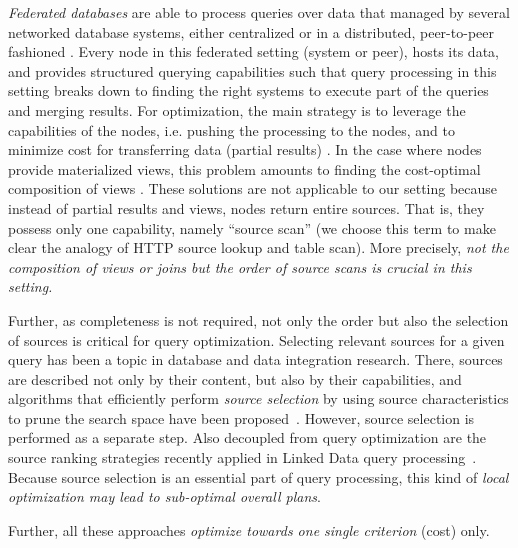 \emph{Federated databases} are able to process queries over data that
managed by several networked database systems, either centralized
\cite{} or in a distributed, peer-to-peer fashioned \cite{}. Every
node in this federated setting (system or peer), hosts its data, and
provides structured querying capabilities such that query processing
in this setting breaks down to finding the right systems to execute
part of the queries and merging results. For optimization, the main
strategy is to leverage the capabilities of the nodes, i.e. pushing
the processing to the nodes, and to minimize cost for transferring
data (partial results) \cite{}. In the case where nodes provide
materialized views, this problem amounts to finding the cost-optimal
composition of views \cite{pottinger_minicon:_2001}. These solutions
are not applicable to our setting because instead of partial results
and views, nodes return entire sources. That is, they possess only one
capability, namely ``source scan'' (we choose this term to make clear
the analogy of HTTP source lookup and table scan). More precisely,
\emph{not the composition of views or joins but the order of source
  scans is crucial in this setting.} 

Further, as completeness is not required, not only the order but also
the selection of sources is critical for query optimization. Selecting
relevant sources for a given query has been a topic in database and
data integration research. There, sources are described not only by
their content, but also by their capabilities, and algorithms that
efficiently perform \emph{source selection} by using source
characteristics to prune the search space have been
proposed~\cite{levy_querying_1996}. However, source selection is
performed as a separate step. Also decoupled from query optimization
are the source ranking strategies recently applied in Linked Data
query processing~\cite{harth_data_2010,ladwig_linked_2010}. Because
source selection is an essential part of query processing, this kind
of \emph{local optimization may lead to sub-optimal overall plans}.


Further, all these approaches \emph{optimize towards one single
  criterion} (cost) only.

